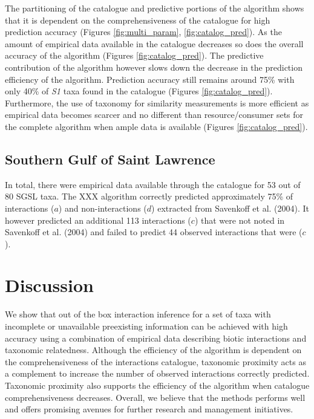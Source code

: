 \documentclass[letterpaper]{article}
\begin{document}
The partitioning of the catalogue and predictive portions of the algorithm shows that it is dependent on the comprehensiveness of the catalogue for high prediction accuracy (Figures \ref{fig:multi_param}, \ref{fig:catalog_pred}). As the amount of empirical data available in the catalogue decreases so does the overall accuracy of the algorithm (Figures \ref{fig:catalog_pred}). The predictive contribution of the algorithm however slows down the decrease in the prediction efficiency of the algorithm. Prediction accuracy still remains around 75\% with only 40\% of \textit{S1} taxa found in the catalogue (Figures \ref{fig:catalog_pred}). Furthermore, the use of taxonomy for similarity measurements is more efficient as empirical data becomes scarcer and no different than resource/consumer sets for the complete algorithm when ample data is available (Figures \ref{fig:catalog_pred}).

    \subsection{Southern Gulf of Saint Lawrence}
In total, there were empirical data available through the catalogue for 53 out of 80 SGSL taxa. The XXX algorithm correctly predicted approximately 75\% of interactions ($a$) and non-interactions ($d$) extracted from Savenkoff et al. (2004). It however predicted an additional 113 interactions ($c$) that were not noted in Savenkoff et al. (2004) and failed to predict 44 observed interactions that were ($c$).



\section{Discussion}
We show that out of the box interaction inference for a set of taxa with incomplete or unavailable preexisting information can be achieved with high accuracy using a combination of empirical data describing biotic interactions and taxonomic relatedness. Although the efficiency of the algorithm is dependent on the comprehensiveness of the interactions catalogue, taxonomic proximity acts as a complement to increase the number of observed interactions correctly predicted. Taxonomic proximity also supports the efficiency of the algorithm when catalogue comprehensiveness decreases. Overall, we believe that the methods performs well and offers promising avenues for further research and management initiatives.
\end{document}
